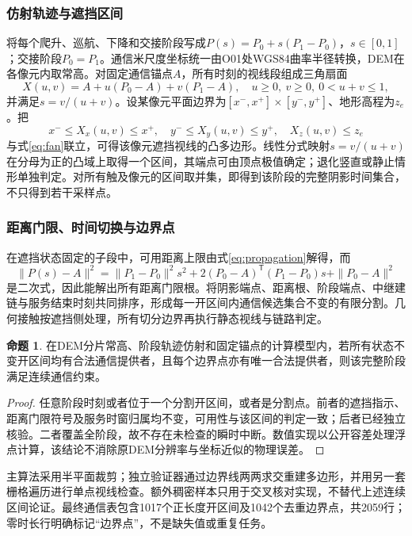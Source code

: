 \documentclass[a4paper]{my_paper}%
\numberwithin{equation}{section}
\theoremstyle{definition}
\newtheorem{proposition}{命题}[section]
\begin{document}
\subsubsection{仿射轨迹与遮挡区间}
将每个爬升、巡航、下降和交接阶段写成$P(s)=P_0+s(P_1-P_0)$，$s\in[0,1]$；交接阶段$P_0=P_1$。通信米尺度坐标统一由O01处WGS84曲率半径转换，DEM在各像元内取常高。对固定通信锚点$A$，所有时刻的视线段组成三角扇面
\begin{equation}
 X(u,v)=A+u(P_0-A)+v(P_1-A),\quad
 u\ge0,\ v\ge0,\ 0<u+v\le1,
 \label{eq:fan}
\end{equation}
并满足$s=v/(u+v)$。设某像元平面边界为$[x^-,x^+]\times[y^-,y^+]$、地形高程为$z_e$。把
\begin{equation}
 x^-\le X_x(u,v)\le x^+,\quad
 y^-\le X_y(u,v)\le y^+,\quad
 X_z(u,v)\le z_e
 \label{eq:shadowpoly}
\end{equation}
与式\eqref{eq:fan}联立，可得该像元遮挡视线的凸多边形。线性分式映射$s=v/(u+v)$在分母为正的凸域上取得一个区间，其端点可由顶点极值确定；退化竖直或静止情形单独判定。对所有触及像元的区间取并集，即得到该阶段的完整阴影时间集合，不只得到若干采样点。

\subsubsection{距离门限、时间切换与边界点}
在遮挡状态固定的子段中，可用距离上限由式\eqref{eq:propagation}解得，而
\begin{equation}
 \|P(s)-A\|^2
 =\|P_1-P_0\|^2s^2
 +2(P_0-A)^{\mathsf T}(P_1-P_0)s+\|P_0-A\|^2
 \label{eq:distancequad}
\end{equation}
是二次式，因此能解出所有距离门限根。将阴影端点、距离根、阶段端点、中继建链与服务结束时刻共同排序，形成每一开区间内通信候选集合不变的有限分割。几何接触按遮挡侧处理，所有切分边界再执行静态视线与链路判定。

\begin{proposition}
在DEM分片常高、阶段轨迹仿射和固定锚点的计算模型内，若所有状态不变开区间均有合法通信提供者，且每个边界点亦有唯一合法提供者，则该完整阶段满足连续通信约束。
\end{proposition}
\begin{proof}
任意阶段时刻或者位于一个分割开区间，或者是分割点。前者的遮挡指示、距离门限符号及服务时窗归属均不变，可用性与该区间的判定一致；后者已经独立核验。二者覆盖全阶段，故不存在未检查的瞬时中断。数值实现以公开容差处理浮点计算，该结论不消除原DEM分辨率与坐标近似的物理误差。
\end{proof}

主算法采用半平面裁剪；独立验证器通过边界线两两求交重建多边形，并用另一套栅格遍历进行单点视线检查。额外稠密样本只用于交叉核对实现，不替代上述连续区间论证。最终通信表包含1017个正长度开区间及1042个去重边界点，共2059行；零时长行明确标记“边界点”，不是缺失值或重复任务。
\end{document}

